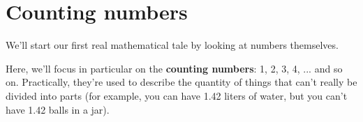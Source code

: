 \documentclass{book}
\begin{document}







\section{Counting numbers}

We'll start our first real mathematical tale by looking at numbers themselves. 

Here, we'll focus in particular on the \textbf{counting numbers}: 1, 2, 3, 4, ... and so on. Practically, they're used to describe the quantity of things that can't really be divided into parts (for example, you can have 1.42 liters of water, but you can't have 1.42 balls in a jar). 



\end{document}
